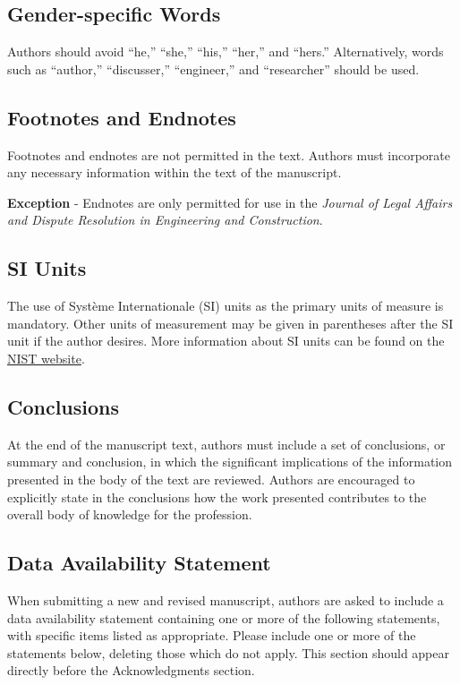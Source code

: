 \documentclass[Journal,letterpaper,NoLineNumbers]{ascelike-new}
\begin{document}
\subsection{Gender-specific Words}
Authors should avoid ``he,'' ``she,'' ``his,'' ``her,'' and ``hers.'' Alternatively, words such as ``author,'' ``discusser,'' ``engineer,'' and ``researcher'' should be used.

\subsection{Footnotes and Endnotes}

Footnotes and endnotes are not permitted in the text. Authors must incorporate any necessary information within the text of the manuscript.

\textbf{Exception} - Endnotes are only permitted for use in the \textit{Journal of Legal Affairs and Dispute Resolution in Engineering and Construction}.

\subsection{SI Units}

The use of Système Internationale (SI) units as the primary units of measure is mandatory. Other units of measurement may be given in parentheses after the SI unit if the author desires. More information about SI units can be found on the \href{http://physics.nist.gov/cuu/Units/index.html}{NIST website}.

\subsection{Conclusions}

At the end of the manuscript text, authors must include a set of conclusions, or summary and conclusion, in which the significant implications of the information presented in the body of the text are reviewed. Authors are encouraged to explicitly state in the conclusions how the work presented contributes to the overall body of knowledge for the profession.

\subsection{Data Availability Statement}

When submitting a new and revised manuscript, authors are asked to include a data availability statement containing one or more of the following statements, with specific items listed as appropriate. Please include one or more of the statements below, deleting those which do not apply. This section should appear directly before the Acknowledgments section. 
\end{document}
